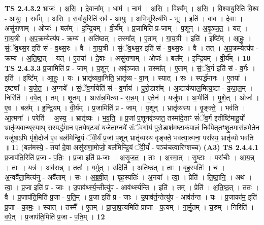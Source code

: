 \documentclass[17pt]{extarticle}
\begin{document}
                  \newline
                                \textbf{ TS 2.4.3.2} \newline
                  भ्राजः॑ । अ॒सि॒ । दे॒वाना᳚म् । धाम॑ । नाम॑ । अ॒सि॒ । विश्व᳚म् । अ॒सि॒ । वि॒श्वायु॒रिति॑ वि॒श्व - आ॒युः॒ । सर्व᳚म् । अ॒सि॒ । स॒र्वायु॒रिति॑ स॒र्व - आ॒युः॒ । अ॒भि॒भूरित्य॑भि - भूः । इति॑ । वाव । दे॒वाः । असु॑राणाम् । ओजः॑ । बल᳚म् । इ॒न्द्रि॒यम् । वी॒र्य᳚म् । प्र॒जामिति॑ प्र-जाम् । प॒शून् । अ॒वृ॒ञ्ज॒त॒ । यत् । गा॒य॒त्री । अ॒प॒क्रम्येत्य॑प - क्रम्य॑ । अति॑ष्ठत् । तस्मा᳚त् । ए॒ताम् । गा॒य॒त्री । इति॑ । इष्टि᳚म् । आ॒हुः॒ । सं॒ॅव॒थ्स॒र इति॑ सं - व॒थ्स॒रः । वै । गा॒य॒त्री । सं॒ॅव॒थ्स॒र इति॑ सं - व॒थ्स॒रः । वै । तत् । अ॒प॒क्रम्येत्य॑प - क्रम्य॑ । अ॒ति॒ष्ठ॒त् । यत् । ए॒तया᳚ । दे॒वाः । असु॑राणाम् । ओजः॑ । बल᳚म् । इ॒न्द्रि॒यम् । वी॒र्य᳚म् । \textbf{  10} \newline
                  \newline
                                \textbf{ TS 2.4.3.3} \newline
                  प्र॒जामिति॑ प्र - जाम् । प॒शून् । अवृ॑ञ्जत । तस्मा᳚त् । ए॒ताम् । सं॒ॅव॒र्ग इति॑ सं - व॒र्गः । इति॑ । इष्टि᳚म् । आ॒हुः॒ । यः । भ्रातृ॑व्यवा॒निति॒ भ्रातृ॑व्य - वा॒न् । स्यात् । सः । स्पर्द्ध॑मानः । ए॒तया᳚ । इष्ट्या᳚ । य॒जे॒त॒ । अ॒ग्नये᳚ । सं॒ॅव॒र्गायेति॑ सं - व॒र्गाय॑ । पु॒रो॒डाश᳚म् । अ॒ष्टाक॑पाल॒मित्य॒ष्टा - क॒पा॒ल॒म् । निरिति॑ । व॒पे॒त् । तम् । शृ॒तम् । आस॑न्न॒मित्या - स॒न्न॒म् । ए॒तेन॑ । यजु॑षा । अ॒भीति॑ । मृ॒शे॒त् । ओजः॑ । ए॒व । बल᳚म् । इ॒न्द्रि॒यम् । वी॒र्य᳚म् । प्र॒जामिति॑ प्र - जाम् । प॒शून् । भ्रातृ॑व्यस्य । वृ॒ङ्क्ते॒ । भव॑ति । आ॒त्मना᳚ । परेति॑ । अ॒स्य॒ । भ्रातृ॑व्यः । भ॒व॒ति॒ ॥ \textbf{ } \newline
                  \newline
                      प्र॒जां प॒शूनवृ॑ञ्जत॒ तस्मा॑दे॒ताꣳ सं॑ॅव॒र्ग इतीष्टि॑माहु॒र्यो भ्रातृ॑व्यवा॒न्थ्‌स्याथ् सस्पर्द्ध॑मान ए॒तयेष्‌ट्या॑ यजेता॒ग्नये॑ संॅव॒र्गाय॑ पुरो॒डाश॑म॒ष्टाक॑पालं॒ निर्व॑पे॒त्‌तꣳशृ॒तमास॑न्नमे॒तेन॒ यजु॑षा॒ऽभि मृ॑शे॒दोज॑ ए॒व बल॑मिन्द्रि॒यं ॅवी॒र्यं॑ प्र॒जां प॒शून् भ्रातृ॑व्यस्य वृङ्क्ते॒ भव॑त्या॒त्मना॒ परा᳚स्य॒ भ्रातृ॑व्यो भवति ॥ 11  (बल॑मस्ये॒ - तया॑ दे॒वा असु॑राणा॒मोजो॒ बल॑मिन्द्रि॒यं ॅवी॒र्यं॑ - पञ्च॑चत्वारिꣳशच्च)  \textbf{(A3)} \newline \newline
                                \textbf{ TS 2.4.4.1} \newline
                  प्र॒जाप॑ति॒रिति॑ प्र॒जा - प॒तिः॒ । प्र॒जा इति॑ प्र-जाः । अ॒सृ॒ज॒त॒ । ताः । अ॒स्मा॒त् । सृ॒ष्टाः । परा॑चीः । आ॒य॒न्न् । ताः । यत्र॑ । अव॑सन्न् । ततः॑ । ग॒र्मुत् । उदिति॑ । अ॒ति॒ष्ठ॒त् । ताः । बृह॒स्पतिः॑ । च॒ । अ॒न्ववै॑ता॒मित्य॑नु - अवै॑ताम् । सः । अ॒ब्र॒वी॒त् । बृह॒स्पतिः॑ । अ॒नया᳚ । त्वा॒ । प्रेति॑ । ति॒ष्ठा॒नि॒ । अथ॑ । त्वा॒ । प्र॒जा इति॑ प्र - जाः । उ॒पाव॑र्थ्स्य॒न्तीत्यु॑प - आव॑र्थ्स्यन्ति । इति॑ । तम् । प्रेति॑ । अ॒ति॒ष्ठ॒त् । ततः॑ । वै । प्र॒जाप॑ति॒मिति॑ प्र॒जा - प॒ति॒म् । प्र॒जा इति॑ प्र - जाः । उ॒पाव॑र्त॒न्तेत्यु॑प - आव॑र्तन्त । यः । प्र॒जाका॑म॒ इति॑ प्र॒जा - का॒मः॒ । स्यात् । तस्मै᳚ । ए॒तम् । प्रा॒जा॒प॒त्यमिति॑ प्राजा - प॒त्यम् । गा॒र्मु॒तम् । च॒रुम् । निरिति॑ । व॒पे॒त् । प्र॒जाप॑ति॒मिति॑ प्र॒जा - प॒ति॒म् । \textbf{  12} \newline
\end{document}
